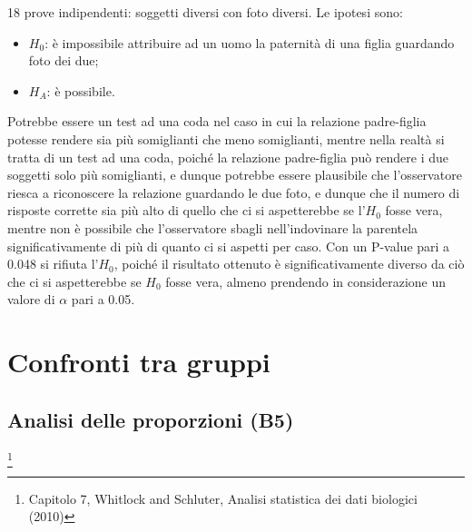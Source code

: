 \documentclass[drafts, 10pt]{book}
\newcounter{example}[section]
\begin{document}
\begin{example}
    18 prove indipendenti: soggetti diversi con foto diversi.
    Le ipotesi sono:
    \begin{itemize}
        \item $H_0$: è impossibile attribuire ad un uomo la paternità di una figlia guardando foto dei due;
        \item $H_A$: è possibile.
    \end{itemize}
    Potrebbe essere un test ad una coda nel caso in cui la relazione padre-figlia potesse rendere sia più somiglianti che meno somiglianti, mentre nella realtà si tratta di un test ad una coda, poiché la relazione padre-figlia può rendere i due soggetti solo più somiglianti, e dunque potrebbe essere plausibile che l’osservatore riesca a riconoscere la relazione guardando le due foto, e dunque che il numero di risposte corrette sia più alto di quello che ci si aspetterebbe se l’$H_0$ fosse vera, mentre non è possibile che l’osservatore sbagli nell’indovinare la parentela significativamente di più di quanto ci si aspetti per caso.
    Con un P-value pari a 0.048 si rifiuta l’$H_0$, poiché il risultato ottenuto è significativamente diverso da ciò che ci si aspetterebbe se $H_0$ fosse vera, almeno prendendo in considerazione un valore di $\alpha$ pari a 0.05.
\end{example}

\part{Confronti tra gruppi}


\chapter{Analisi delle proporzioni (B5)}\footnote{Capitolo 7, Whitlock and Schluter, Analisi statistica dei dati biologici (2010)}
\end{document}
